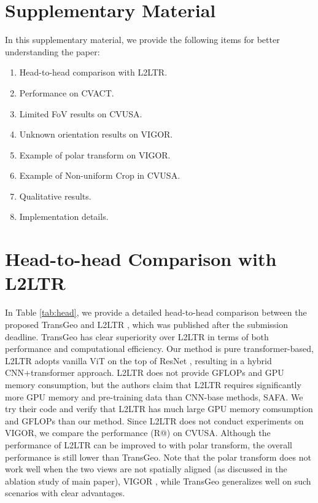 \documentclass[10pt,twocolumn,letterpaper]{article}
\begin{document}
\clearpage
\appendix
\normalsize


\section*{Supplementary Material}
In this supplementary material, we  provide  the  following items for better understanding the paper:
\begin{enumerate}
\item Head-to-head comparison with L2LTR.
    \item Performance on CVACT.
    \item Limited FoV results on CVUSA.
    \item Unknown orientation results on VIGOR.
    \item Example of polar transform on VIGOR.
    \item Example of Non-uniform Crop in CVUSA.
    \item Qualitative results.
    \item Implementation details.
    
\end{enumerate}










\section{Head-to-head Comparison with L2LTR}
In Table \ref{tab:head}, we provide a detailed head-to-head comparison between the proposed TransGeo and L2LTR \cite{yang2021cross}, which was published after the submission deadline. TransGeo has clear superiority over L2LTR in terms of both performance and computational efficiency. Our method is pure transformer-based, L2LTR adopts vanilla ViT \cite{vit} on the top of ResNet \cite{he2016deep}, resulting in a hybrid CNN+transformer approach. L2LTR \cite{yang2021cross} does not provide GFLOPs and GPU memory consumption, but the authors claim that L2LTR requires significantly more GPU memory and pre-training data than CNN-base methods, \ie SAFA. We try their code and verify that L2LTR has much large GPU memory comsumption and GFLOPs than our method. Since L2LTR does not conduct experiments on VIGOR, we compare the performance (R@) on CVUSA.
Although the performance of L2LTR can be improved to  with polar transform, the overall performance is still lower than TransGeo. Note that the polar transform does not work well when the two views are not spatially aligned (as discussed in the ablation study of main paper), \eg VIGOR \cite{zhu2021vigor}, while TransGeo generalizes well on such scenarios with clear advantages.
\end{document}
